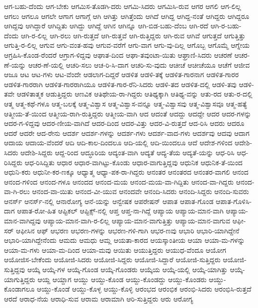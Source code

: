 {ಆಗ-ಬಹು-ದೆಂದು
ಆಗ-ಬೇಕು
ಆಗಮಿಸ-ತೊಡಗಿ-ದರು
ಆಗಮಿ-ಸಿದರು
ಆಗಮಿಸಿ-ರುವ
ಆಗರ
ಆಗಲಿ
ಆಗ-ಲಿಲ್ಲ
ಆಗಲು
ಆಗಲೂ
ಆಗಲೇ
ಆಗಾಗ
ಆಗಾಗ್ಗೆ
ಆಗಿ
ಆಗಿತ್ತು
ಆಗಿತ್ತೆಂದು
ಆಗಿದೆ
ಆಗಿದ್ದ
ಆಗಿದ್ದ-ನಂತೆ
ಆಗಿದ್ದರು
ಆಗಿದ್ದರೂ
ಆಗಿದ್ದವು
ಆಗಿದ್ದಾರೆ
ಆಗಿದ್ದಿತು
ಆಗಿದ್ದು
ಆಗಿದ್ದೆ
ಆಗಿನ
ಆಗಿನ್ನೂ
ಆಗಿ-ಬಿಡ-ಬಹು-ದೆಂಬ
ಆಗಿ-ರದೆ
ಆಗಿ-ರ-ಬಹು-ದೆಂದು
ಆಗಿ-ರ-ಲಿಲ್ಲ
ಆಗಿ-ರಲು
ಆಗಿ-ರುತ್ತದೆ
ಆಗಿ-ರುತ್ತವೆ
ಆಗಿ-ರುತ್ತಿದ್ದರು
ಆಗಿ-ರುವ
ಆಗಿವೆ
ಆಗುತ್ತದೆ
ಆಗುತ್ತಿತ್ತು
ಆಗುತ್ತಿ-ರ-ಲಿಲ್ಲ
ಆಗುವ
ಆಗು-ವಂತ-ಹವು
ಆಗುವ-ವರೆಗೆ
ಆಗು-ವಾಗ
ಆಗು-ವು-ದಿಲ್ಲ
ಆಗೊಬ್ಬ
ಆಗೊಮ್ಮೆ
ಆಗ್ನೇಯ
ಆಗ್ರಹಿಸಿ-ಕೊಂಡ-ರೆಂದರೆ
ಆಗ್ರಾಗ-ಳಿದ್ದವು
ಆಘಾತ-ದಿಂದ
ಆಘಾ-ತವುಂಟಾ-ಯಿತು
ಆಘ್ರಾಣಿ-ಸಿದರು
ಆಚರಣೆ
ಆಚರ-ಣೆ-ಯನ್ನು
ಆಚರ-ಣೆ-ಯಲ್ಲಿ
ಆಚರಿ-ಸಲು
ಆಚ-ರಿ-ಸಿ-ದಾಗ
ಆಚರಿ-ಸು-ವುದು
ಆಚೀಚೆ
ಆಚೀಚೆಯೂ
ಆಚೆಗೆ
ಆಜೀವ
ಆಜೂ
ಆಟ
ಆಟ-ಗಳು
ಆಟ-ವೆಂದೇ
ಆಡಲಾಗ-ದಿದ್ದರೆ
ಆಡಳಿತ
ಆಡಳಿ-ತಕ್ಕೆ
ಆಡಳಿತ-ಗಾರನಾಗ
ಆಡಳಿತ-ಗಾರರ
ಆಡಳಿತ-ಗಾರರಾಗಿ
ಆಡಳಿತ-ಗಾರರಾಗಿಯೂ
ಆಡಳಿತ-ಗಾರ-ರೆನಿ-ಸಿದರು
ಆಡಳಿ-ತದ
ಆಡಳಿತ-ದಲ್ಲಿ
ಆಡಳಿ-ತವು
ಆಡಳಿ-ತವೇ
ಆಡಳಿತಾತ್ಮಕ
ಆಡುತ್ತಿದ್ದರು
ಆಣವಿಕ
ಆತಿಥೇಯ-ರಾ-ಗಿದ್ದರು
ಆತಿಥ್ಯಕ್ಕಾಗಿ
ಆತಿಥ್ಯ-ವನ್ನು
ಆತು-ರದ
ಆತು-ರ-ದಲ್ಲಿ
ಆತ್ಮ
ಆತ್ಮ-ಕಥೆ-ಗಳೂ
ಆತ್ಮ-ಬಲಕ್ಕೆ
ಆತ್ಮ-ವಿಶ್ವಾಸ
ಆತ್ಮ-ವಿಶ್ವಾಸ-ವನ್ನೂ
ಆತ್ಮ-ವಿಶ್ವಾಸವು
ಆತ್ಮ-ವಿಶ್ವಾಸವೂ
ಆತ್ಮ-ಹತ್ಯೆ
ಆತ್ಮೀಯ-ತೆ-ಯಿಂದ
ಆತ್ಮೀಯ-ರಾಗಿ-ರುತ್ತಿದ್ದರು
ಆತ್ಮೀಯ-ವಾಗಿ
ಆದ
ಆದಂತೆ
ಆದದ್ದು
ಆದದ್ದೇ
ಆದರ
ಆದರ-ಗಳನ್ನು
ಆದರ-ಗ-ಳಿದ್ದವು
ಆದರ-ಣೀಯ-ವಾಗಿದೆ
ಆದರ-ದಿಂದ
ಆದರ-ವಿತ್ತು
ಆದರ-ವಿ-ರುತ್ತದೆ
ಆದ-ರಿಸಿ
ಆದರು
ಆದರೂ
ಆದರೆ
ಆದರೇ
ಆದ-ರೇನು
ಆದರ್ಶ
ಆದರ್ಶ-ಗಳನ್ನು
ಆದರ್ಶ-ಗಳು
ಆದರ್ಶ-ವಾದ-ಗಳು
ಆದರ್ಶವು
ಆದವು
ಆದಾಗ
ಆದಾಯ
ಆದಾಯ-ವೆಂದರೆ
ಆದಿ
ಆದಿ-ಕಾಲ-ದಿಂದಲೂ
ಆದಿ-ಯಲ್ಲಿ
ಆದಿ-ಯಿಂದಲೂ
ಆದೆ
ಆದೇಶ-ಗಳಿಂದ
ಆದೇಶಿ-ಸಿದರು
ಆದೇಶಿ-ಸಿದ್ದರು
ಆದ್ದ-ರಿಂದ
ಆದ್ಧೂರಿಯ
ಆದ್ಯಂತ-ವಾಗಿ
ಆದ್ಯತೆ
ಆದ್ಯ-ತೆಯ
ಆದ್ಯತೆ-ಯನ್ನು
ಆಧ-ರಿಸಿ
ಆಧ-ರಿಸಿದ್ದರು
ಆಧ-ರಿಸಿದ್ದಿತು
ಆಧಾರ
ಆಧಾರ-ವಾಗಿಟ್ಟು-ಕೊಂಡು
ಆಧಾರ-ವಾಗುತ್ತಿದ್ದವು
ಆಧುನಿಕ
ಆಧುನಿಕ-ತೆ-ಯಿಂದ
ಆಧುನಿ-ಕರು
ಆಧುನೀ-ಕರ-ಣಕ್ಕೂ
ಆಧ್ಯಾತ್ಮ
ಆಧ್ಯಾ-ಪಕ-ರಾ-ಗಿದ್ದರು
ಆನಂತರ
ಆನಂತರದ
ಆನಂತರ-ವಾಗಲಿ
ಆನಂದ
ಆನಂದ-ಗಳಿಂದ
ಆನಂದ-ಗಳೂ
ಆನಂದದ
ಆನಂದ-ಮಯ
ಆನಂದ-ಮಯ-ವಾ-ಗಿದ್ದಿತು
ಆನಂದ-ವಾ-ಗಿದ್ದರು
ಆನಂದ-ವಾ-ಗಿ-ರಲು
ಆನಂದ-ವಾ-ಯಿತು
ಆನಂದ-ವೀ-ಯುವ
ಆನಂದವೇ
ಆನಂದಿ-ಸಿದರು
ಆನಂದಿ-ಸಿದ್ದರು
ಆನಂದಿ-ಸುವರು
ಆನರ್ಸ್
ಆನರ್ಸ್-ನಲ್ಲಿ
ಆನಾರೋಗ್ಯ
ಆನೆ-ಯನ್ನು
ಆನ್ವೇಷಕ
ಆಪರೇಷನ್
ಆಪಾತ
ಆಪಾತ-ಗೊಂಡ
ಆಪಾತ-ಗೊಳಿಸಿ-ದಾಗ
ಆಪಾತ-ರೋ-ಹಿತ
ಆಪ್ಟಿಕಲ್
ಆಪ್ಟಿಕ್ಸ್-ನಲ್ಲಿ
ಆಪ್ತ
ಆಪ್ತ-ನಾ-ಗಿದ್ದೆ
ಆಪ್ಯಾಯ
ಆಪ್ಯಾಯ-ಮಾನ-ವಾಗಿ
ಆಪ್ಯಾಯ-ಮಾನ-ವಾಗಿದ್ದವು
ಆಪ್ಯಾಯ-ಮಾನ-ವಾಗಿ-ರ-ಲಿಲ್ಲ
ಆಪ್ಯಾಯ-ಮಾನ-ವಾಗುತ್ತಿತ್ತು
ಆಪ್ಯಾಯ-ಮಾನ-ವಾಗುವ
ಆಫೀ-ಸರ್
ಆಫೀಸಿನ
ಆಫ್
ಆಭರಣ
ಆಭರಣ-ಗಳನ್ನು
ಆಭರಣ-ಗಳಿ-ಗಾಗಿ
ಆಭರ-ಣವು
ಆಭಾರಿ
ಆಭಾರಿ-ಯಾಗಿದ್ದೇನೆ
ಆಭಾರಿ-ಯಾಗಿದ್ದೇನೆಂದು
ಆಮದು
ಆಮಧು
ಆಮ್ಲ
ಆಯತಾ-ಕಾರದ
ಆಯಸ್ಕಾಂತೀಯ
ಆಯಾ
ಆಯಾ-ಮ-ಗಳನ್ನು
ಆಯಾ-ಮ-ಗಳು
ಆಯಾ-ಮ-ದಿಂದ
ಆಯಾ-ಮವು
ಆಯಿತು
ಆಯುತ್ತಿದ್ದರು
ಆಯುಧ-ವೆಂದೂ
ಆಯೋಗ
ಆಯೋಜಿಸ-ಬೇಕೆಂದು
ಆಯೋಜಿ-ಸಿದರು
ಆಯೋಜಿ-ಸಿದ್ದರು
ಆಯೋಜಿ-ಸಿದ್ದಾರೆ
ಆಯೋಜಿ-ಸುತ್ತಿದ್ದರು
ಆಯೋಜಿ-ಸುತ್ತಿದ್ದವು
ಆಯ್ಕೆ
ಆಯ್ಕೆ-ಗಳ
ಆಯ್ಕೆ-ಗೊಂಡ
ಆಯ್ಕೆ-ಗೊಂಡರು
ಆಯ್ಕೆಯ
ಆಯ್ಕೆ-ಯಲ್ಲಿ
ಆಯ್ಕೆ-ಯಾಗಿತ್ತು
ಆಯ್ಕೆ-ಯಾಗುತ್ತಿದ್ದರು
ಆಯ್ದ
ಆಯ್ದಾಗ
ಆಯ್ದು
ಆಯ್ದು-ಕೊಂಡ
ಆಯ್ದು-ಕೊಂಡದ್ದು
ಆಯ್ದು-ಕೊಂಡರು
ಆಯ್ದು-ಕೊಂಡಾಗಲೂ
ಆಯ್ದು-ಕೊಂಡೆ
ಆಯ್ದು-ಕೊಳ್ಳ
ಆಯ್ದು-ಕೊಳ್ಳಿ
ಆರಂಭದ
ಆರಂಭಿಕ
ಆರಂಭಿ-ಸಿದರು
ಆರಂಭಿಸಿ-ರುತ್ತದೆ
ಆರದೆ
ಆರಾಧ-ನೆಯ
ಆರಾಧಿ-ಸುವ
ಆರಾಮ
ಆರಾಮಾಗಿ
ಆರಿ-ಸುತ್ತಿದ್ದರು
ಆರು
ಆರೋಗ್ಯ
}
